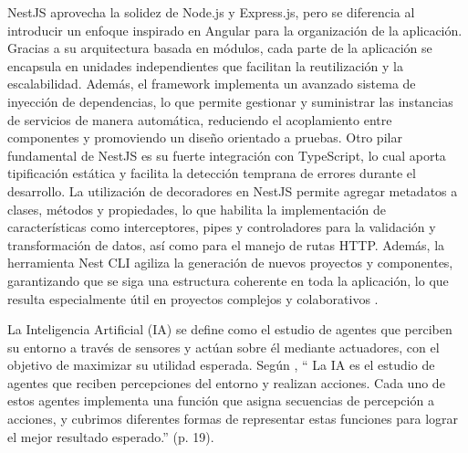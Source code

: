 NestJS aprovecha la solidez de Node.js y Express.js, pero se diferencia al introducir un enfoque inspirado en Angular para la organización de la aplicación. Gracias a su arquitectura basada en módulos, cada parte de la aplicación se encapsula en unidades independientes que facilitan la reutilización y la escalabilidad. Además, el framework implementa un avanzado sistema de inyección de dependencias, lo que permite gestionar y suministrar las instancias de servicios de manera automática, reduciendo el acoplamiento entre componentes y promoviendo un diseño orientado a pruebas. Otro pilar fundamental de NestJS es su fuerte integración con TypeScript, lo cual aporta tipificación estática y facilita la detección temprana de errores durante el desarrollo. La utilización de decoradores en NestJS permite agregar metadatos a clases, métodos y propiedades, lo que habilita la implementación de características como interceptores, pipes y controladores para la validación y transformación de datos, así como para el manejo de rutas HTTP. Además, la herramienta Nest CLI agiliza la generación de nuevos proyectos y componentes, garantizando que se siga una estructura coherente en toda la aplicación, lo que resulta especialmente útil en proyectos complejos y colaborativos  \cite{sabo_nestjs_2020}.


La Inteligencia Artificial (IA) se define como el estudio de agentes que perciben su entorno a través de sensores y actúan sobre él mediante actuadores, con el objetivo de maximizar su utilidad esperada. Según \citeauthor{russell_artificial_2022} \citeyear{russell_artificial_2022}, `` La IA es el estudio de agentes que reciben percepciones del entorno y realizan acciones. Cada uno de estos agentes implementa una función que asigna secuencias de percepción a acciones, y cubrimos diferentes formas de representar estas funciones para lograr el mejor resultado esperado.'' (p. 19).

